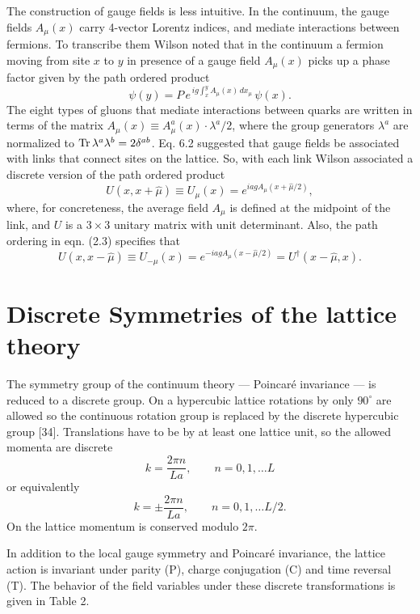The construction of gauge fields is less intuitive. In the continuum, the gauge fields \(A_\mu(x)\) carry 4-vector Lorentz indices, and mediate interactions between fermions. To transcribe them Wilson noted that in the continuum a fermion moving from site \(x\) to \(y\) in presence of a gauge field \(A_\mu(x)\) picks up a phase factor given by the path ordered product
\begin{equation}
\psi(y) = P\, e^{\,ig\int_x^y A_\mu(x)\,dx_\mu}\, \psi(x) .
\end{equation}
The eight types of gluons that mediate interactions between quarks are written in terms of the matrix \(A_\mu(x) \equiv A_\mu^a(x) \cdot \lambda^a/2\), where the group generators \(\lambda^a\) are normalized to \(\Tr \lambda^a \lambda^b = 2\delta^{ab}\). Eq. 6.2 suggested that gauge fields be associated with links that connect sites on the lattice. So, with each link Wilson associated a discrete version of the path ordered product
\begin{equation}
U(x, x+\hat{\mu}) \equiv U_\mu(x) = e^{iagA_\mu(x+\hat{\mu}/2)} ,
\end{equation}
where, for concreteness, the average field \(A_\mu\) is defined at the midpoint of the link, and \(U\) is a \(3 \times 3\) unitary matrix with unit determinant. Also, the path ordering in eqn. (2.3) specifies that
\begin{equation}
U(x, x-\hat{\mu}) \equiv U_{-\mu}(x) = e^{-iagA_\mu(x-\hat{\mu}/2)} = U^\dagger(x - \hat{\mu}, x) .
\end{equation}

\section{Discrete Symmetries of the lattice theory}

The symmetry group of the continuum theory --- Poincar\'e invariance --- is reduced to a discrete group. On a hypercubic lattice rotations by only \(90^\circ\) are allowed so the continuous rotation group is replaced by the discrete hypercubic group [34]. Translations have to be by at least one lattice unit, so the allowed momenta are discrete
\[
k = \frac{2\pi n}{La}, \qquad n = 0, 1, \ldots L
\]
or equivalently
\[
k = \pm \frac{2\pi n}{La}, \qquad n = 0, 1, \ldots L/2 .
\]
On the lattice momentum is conserved modulo \(2\pi\).

In addition to the local gauge symmetry and Poincar\'e invariance, the lattice action is invariant under parity (P), charge conjugation (C) and time reversal (T). The behavior of the field variables under these discrete transformations is given in Table 2.

